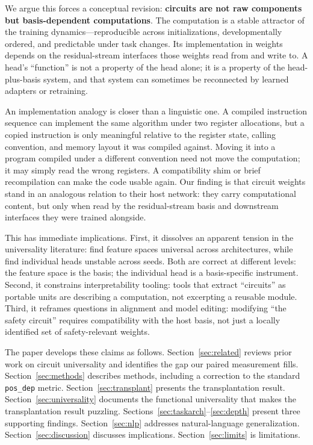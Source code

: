 \documentclass[final]{article}
\begin{document}
We argue this forces a conceptual revision: \textbf{circuits are not raw
components but basis-dependent computations}. The computation is a stable
attractor of the training dynamics---reproducible across initializations,
developmentally ordered, and predictable under task changes. Its implementation
in weights depends on the residual-stream interfaces those weights read from
and write to. A head's ``function'' is not a property of the head alone; it is a
property of the head-plus-basis system, and that system can sometimes be
reconnected by learned adapters or retraining.

An implementation analogy is closer than a linguistic one. A compiled
instruction sequence can implement the same algorithm under two register
allocations, but a copied instruction is only meaningful relative to the
register state, calling convention, and memory layout it was compiled against.
Moving it into a program compiled under a different convention need not move the
computation; it may simply read the wrong registers. A compatibility shim or
brief recompilation can make the code usable again. Our finding is that circuit
weights stand in an analogous relation to their host network: they carry
computational content, but only when read by the residual-stream basis and
downstream interfaces they were trained alongside.

This has immediate implications. First, it dissolves an apparent tension in the
universality literature: \citet{lan2025universal} find feature spaces universal
across architectures, while \citet{bali2026headstability} find individual heads
unstable across seeds. Both are correct at different levels: the feature space
is the basis; the individual head is a basis-specific instrument. Second, it
constrains interpretability tooling: tools that extract ``circuits'' as portable
units are describing a computation, not excerpting a reusable module. Third, it
reframes questions in alignment and model editing: modifying ``the safety
circuit'' requires compatibility with the host basis, not just a locally
identified set of safety-relevant weights.

The paper develops these claims as follows. Section~\ref{sec:related} reviews
prior work on circuit universality and identifies the gap our paired measurement
fills. Section~\ref{sec:methods} describes methods, including a correction to
the standard \texttt{pos\_dep} metric. Section~\ref{sec:transplant} presents
the transplantation result. Section~\ref{sec:universality} documents the
functional universality that makes the transplantation result puzzling.
Sections~\ref{sec:taskarch}--\ref{sec:depth} present three supporting findings.
Section~\ref{sec:nlp} addresses natural-language generalization.
Section~\ref{sec:discussion} discusses implications. Section~\ref{sec:limits}
is limitations.
\end{document}
